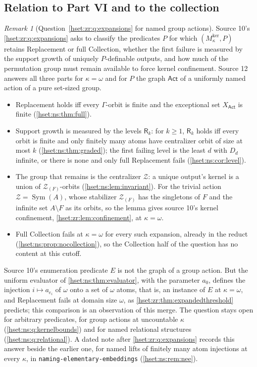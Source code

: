 \documentclass[11pt,letterpaper]{article}
\theoremstyle{definition}
\theoremstyle{remark}
\newtheorem{remark}[remark]{Remark}\aliascntresetthe{remark}
\newcommand{\repo}[1]{\nolinkurl{#1}}
\newcommand{\Mker}{M^{\mathrm{ker}}}
\newcommand{\Sym}{\operatorname{Sym}}
\newcommand{\Act}{\mathsf{Act}}
\begin{document}
\subsection{Relation to Part VI and to the collection}
\label{hset:ns:sub:relation}

\begin{remark}[Question~\ref{hset:zr:q:expansions} for named group actions]
\label{hset:ns:rem:expansions}
Source 10's \cref{hset:zr:q:expansions} asks to classify the predicates $P$ for
which $(\Mker_\kappa,P)$ retains Replacement or full Collection, whether the
first failure is measured by the support growth of uniquely $P$-definable
outputs, and how much of the permutation group must remain available to force
kernel confinement. Source 12 answers all three parts for $\kappa=\omega$ and
for $P$ the graph $\Act$ of a uniformly named action of a pure set-sized group.
\begin{itemize}
\item Replacement holds iff every $\Gamma$-orbit is finite and the exceptional
set $X_{\Act}$ is finite (\cref{hset:ns:thm:full}).
\item Support growth is measured by the levels $\mathsf R_k$: for $k\ge1$,
$\mathsf R_k$ holds iff every orbit is finite and only finitely many atoms have
centralizer orbit of size at most $k$ (\cref{hset:ns:thm:graded}); the first
failing level is the least $d$ with $D_d$ infinite, or there is none and only
full Replacement fails (\cref{hset:ns:cor:level}).
\item The group that remains is the centralizer $\mathcal Z$: a unique output's
kernel is a union of $\mathcal Z_{(F)}$-orbits (\cref{hset:ns:lem:invariant}).
For the trivial action $\mathcal Z=\Sym(A)$, whose stabilizer
$\mathcal Z_{(F)}$ has the singletons of $F$ and the infinite set $A\setminus F$
as its orbits, so the lemma gives source 10's kernel confinement,
\cref{hset:zr:lem:confinement}, at $\kappa=\omega$.
\item Full Collection fails at $\kappa=\omega$ for every such expansion, already
in the reduct (\cref{hset:ns:prop:nocollection}), so the Collection half of the
question has no content at this cutoff.
\end{itemize}
Source 10's enumeration predicate $E$ is not the graph of a group action. But
the uniform evaluator of \cref{hset:ns:thm:evaluator}, with the parameter $a_0$,
defines the injection $i\mapsto a_{e_i}$ of $\omega$ onto a set of $\omega$
atoms, that is, an instance of $E$ at $\kappa=\omega$, and Replacement fails at
domain size $\omega$, as \cref{hset:zr:thm:expandedthreshold} predicts; this
comparison is an observation of this merge. The question stays open for
arbitrary predicates, for group actions at uncountable $\kappa$
(\cref{hset:ns:q:kernelbounds}) and for named relational structures
(\cref{hset:ns:q:relational}). A dated note after
\cref{hset:zr:q:expansions} records this answer beside the earlier one, for
named lifts of finitely many atom injections at every $\kappa$, in
\repo{naming-elementary-embeddings} (\cref{hset:ns:rem:nee}).
\end{remark}
\end{document}
